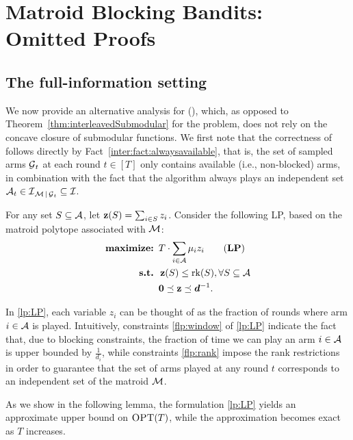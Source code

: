 \section{Matroid Blocking Bandits: Omitted Proofs}

\subsection{The full-information setting}
\label{appendix:mbb:fullinformation}
We now provide an alternative analysis for \ig (\IG), which, as opposed to Theorem~\ref{thm:interleavedSubmodular} for the \rsm problem, does not rely on the concave closure of submodular functions. We first note that the correctness of \IG follows directly by Fact~\ref{inter:fact:alwaysavailable}, that is, the set of sampled arms $\operatorname{\mathcal{G}}_t$ at each round $t \in [T]$ only contains available (i.e., non-blocked) arms, in combination with the fact that the algorithm always plays an independent set $\operatorname{\mathcal{A}}_t \in \operatorname{\mathcal{I}}_{\operatorname{\mathcal{M}}|\operatorname{\mathcal{G}}_t} \subseteq \operatorname{\mathcal{I}}$. 

For any set $S \subseteq \operatorname{\mathcal{A}}$, let $\operatorname{\mathbf{z}}(S) = \sum_{i \in S} z_i$. Consider the following LP, based on the matroid polytope associated with $\operatorname{\mathcal{M}}$:
\begin{align}
\textbf{maximize: }& T \cdot \sum_{i \in \A} \mu_{i} z_{i} \tag{\textbf{LP}} \label{lp:LP}\\
\textbf{s.t. }& \z(S) \leq \rk(S), \forall S\subseteq \A \label{flp:rank}\\
\qquad & {\bf 0} \preceq \z \preceq \bm{d}^{-1}. \label{flp:window}
\end{align}

In \eqref{lp:LP}, each variable $z_{i}$ can be thought of as the fraction of rounds where arm $i\in \operatorname{\mathcal{A}}$ is played. Intuitively, constraints \eqref{flp:window} of \eqref{lp:LP} indicate the fact that, due to blocking constraints, the fraction of time we can play an arm $i \in \operatorname{\mathcal{A}}$ is upper bounded by $\frac{1}{d_i}$, while constraints \eqref{flp:rank} impose the rank restrictions in order to guarantee that the set of arms played at any round $t$ corresponds to an independent set of the matroid $\operatorname{\mathcal{M}}$. 

As we show in the following lemma, the formulation \eqref{lp:LP} yields an approximate upper bound on $\textsc{OPT}(T)$, while the approximation becomes exact as $T$ increases.

